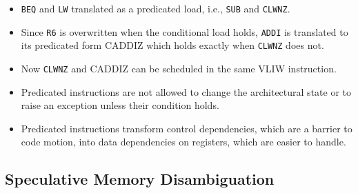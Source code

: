 \documentclass{beamer}
\renewcommand{\emph}[1]{\textcolor{structure}{#1}}
\newcommand{\emp}[1]{\textcolor{DikuRed}{ #1}}
\begin{document}
\begin{frame}[fragile,t]
\begin{scriptsize}
\begin{itemize}
    \item \emp{{\tt BEQ} and {\tt LW}} translated as a \emph{predicated load, i.e., {\tt SUB} and {\tt CLWNZ}}.\pause
    \item Since {\tt R6} is overwritten when the conditional load holds, {\tt ADDI}
            is translated to its predicated form \emph{CADDIZ} which holds
            exactly when {\tt CLWNZ} does not.
    \item Now \emph{{\tt CLWNZ} and \emph{CADDIZ}} can be scheduled in the same VLIW instruction.
    \item Predicated instructions are not allowed to change the architectural state or to raise
            an exception unless their condition holds. 
    \item Predicated instructions transform control dependencies, which are a barrier
            to code motion, into data dependencies on registers, which are easier to handle.
\end  {itemize}
\end{scriptsize}
\end{frame}


\subsection{Speculative Memory Disambiguation}
\end{document}
